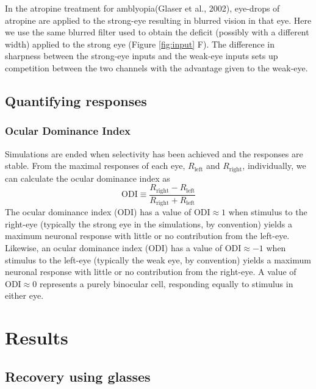 \documentclass[
  onecolumn]{article}
\begin{document}
In the atropine treatment for amblyopia(Glaser et al., 2002), eye-drops
of atropine are applied to the strong-eye resulting in blurred vision in
that eye. Here we use the same blurred filter used to obtain the deficit
(possibly with a different width) applied to the strong eye (Figure
\ref{fig:input} F). The difference in sharpness between the strong-eye
inputs and the weak-eye inputs sets up competition between the two
channels with the advantage given to the weak-eye.

\hypertarget{quantifying-responses}{%
\subsection{Quantifying responses}\label{quantifying-responses}}

\hypertarget{ocular-dominance-index}{%
\subsubsection{Ocular Dominance Index}\label{ocular-dominance-index}}

Simulations are ended when selectivity has been achieved and the
responses are stable. From the maximal responses of each eye,
\(R_{\text{left}}\) and \(R_{\text{right}}\), individually, we can
calculate the ocular dominance index as \[
\text{ODI} \equiv \frac{R_{\text{right}}-R_{\text{left}}}{R_{\text{right}}+R_{\text{left}}}
\] The ocular dominance index (ODI) has a value of
\(\text{ODI} \approx 1\) when stimulus to the right-eye (typically the
strong eye in the simulations, by convention) yields a maximum neuronal
response with little or no contribution from the left-eye. Likewise, an
ocular dominance index (ODI) has a value of \(\text{ODI} \approx -1\)
when stimulus to the left-eye (typically the weak eye, by convention)
yields a maximum neuronal response with little or no contribution from
the right-eye. A value of \(\text{ODI} \approx 0\) represents a purely
binocular cell, responding equally to stimulus in either eye.

\hypertarget{results}{%
\section{Results}\label{results}}

\hypertarget{recovery-using-glasses}{%
\subsection{Recovery using glasses}\label{recovery-using-glasses}}
\end{document}
